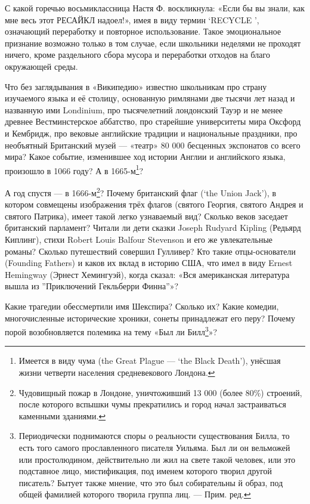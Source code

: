 С какой горечью восьмиклассница Настя Ф. воскликнула: «Если бы вы знали, как мне весь этот РЕСАЙКЛ надоел!», имея в виду термин ‘RECYCLE ’, означающий переработку и повторное использование. Такое эмоциональное признание возможно только в том случае, если школьники неделями не проходят ничего, кроме раздельного сбора мусора и переработки отходов на благо окружающей среды.

Что без заглядывания в «Википедию» известно школьникам про страну изучаемого языка и её столицу, основанную римлянами две тысячи лет назад и названную ими Londinium, про тысячелетний лондонский Тауэр и не менее древнее Вестминстерское аббатство, про старейшие университеты мира Оксфорд и Кембридж, про вековые английские традиции и национальные праздники, про необъятный Британский музей --- «театр» 80 000 бесценных экспонатов со всего мира? Какое событие, изменившее ход истории Англии и английского языка, произошло в 1066 году? А в 1665-м\footnote{Имеется в виду чума (the Great Plague --- ‘the Black Death’), унёсшая жизни четверти населения средневекового Лондона.}?

А год спустя --- в 1666-м\footnote{Чудовищный пожар в Лондоне, уничтоживший 13 000 (более 80\%) строений, после которого вспышки чумы прекратились и город начал застраиваться каменными зданиями.}? Почему британский флаг (‘the Union Jack’), в котором совмещены изображения трёх флагов (святого Георгия, святого Андрея и святого Патрика), имеет такой легко узнаваемый вид? Сколько веков заседает британский парламент? Читали ли дети сказки Joseph Rudyard Kipling (Редьярд Киплинг), стихи Robert Louis Balfour Stevenson и его же увлекательные романы? Сколько путешествий совершил Гулливер? Кто такие отцы-основатели (Founding Fathers) и каков их вклад в историю США, что имел в виду Ernest Hemingway (Эрнест Хемингуэй), когда сказал: «Вся американская литература вышла из ''Приключений Гекльберри Финна''»?

Какие трагедии обессмертили имя Шекспира? Сколько их? Какие комедии, многочисленные исторические хроники, сонеты принадлежат его перу? Почему порой возобновляется полемика на тему «Был ли Билл\footnote{Периодически поднимаются споры о реальности существования Билла, то есть того самого прославленного писателя Уильяма. Был ли он вельможей или простолюдином, действительно ли жил на свете такой человек, или это подставное лицо, мистификация, под именем которого творил другой писатель? Бытует также мнение, что это был собирательны й образ, под общей фамилией которого творила группа лиц. --- Прим. ред.}»?

